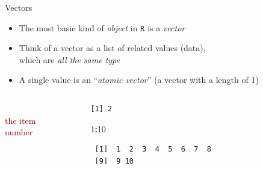 \documentclass[
  11pt,
  ignorenonframetext,
]{beamer}
\newenvironment{Shaded}{\begin{snugshade}}{\end{snugshade}}
\newcommand{\DecValTok}[1]{\textcolor[rgb]{0.00,0.00,0.81}{#1}}
\newcommand{\SpecialCharTok}[1]{\textcolor[rgb]{0.81,0.36,0.00}{\textbf{#1}}}
\newcommand{\R}{\texttt{R}}
\newcommand{\important}[1]{\textcolor{darkred}{#1}}
\begin{document}
\begin{frame}[fragile]{Vectors}
\protect\hypertarget{vectors}{}
\begin{itemize}
\item
  The most basic kind of \emph{object} in \(\R\) is a \emph{vector}
\item
  Think of a vector as a list of related values (data),\\
  which are \emph{all the same type}
\item
  A single value is an ``\emph{atomic vector}'' (a vector with a length
  of 1)
\end{itemize}

\hfill\break

\begin{columns}[c]
\begin{column}{0.25\textwidth}
\centering
\important{\Large{}\\ the item\\ number}
\end{column}

\begin{column}{0.5\textwidth}
\hfill{}

\begin{verbatim}
[1] 2
\end{verbatim}

\begin{Shaded}
\begin{Highlighting}[]
\DecValTok{1}\SpecialCharTok{:}\DecValTok{10}
\end{Highlighting}
\end{Shaded}

\begin{verbatim}
 [1]  1  2  3  4  5  6  7  8
 [9]  9 10
\end{verbatim}

\vspace{-\baselineskip}
\end{column}

\begin{column}{0.25\textwidth}
\centering
\important{\Large\textbf{}}
\end{column}
\end{columns}


\end{frame}
\end{document}
